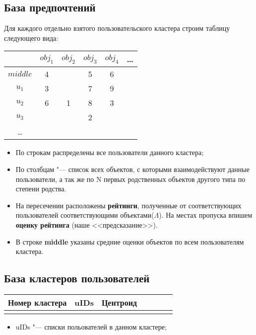 \documentclass[a4paper,14pt]{article}
\begin{document}
\subsection{База предпочтений}
Для каждого отдельно взятого пользовательского кластера строим таблицу следующего вида:
\begin{center}
\begin{tabular}[t]{|c|c|c|c|c|c|}
\hline
    & $obj_1$ & $obj_2$ & $obj_3$ & $obj_4$ & \dots  \\
\hline  
$middle$ & 4 &  & 5 & 6 &   \\  
\hline  
$u_1$ & 3 &  & 7 & 9 &   \\  
\hline 
$u_2$ & 6 & 1  & 8 & 3 &    \\ 
 \hline
$u_3$ &  &  &  2&  &   \\ 
 \hline
\dots &  &  &  &  &   \\ 
 \hline
\end{tabular}
\end{center}
\begin{itemize}
\item По строкам распределены все пользователи данного кластера;
\item По столбцам "--- список всех объектов, с которыми взаимодействуют данные пользователи, а так же по N первых родственных объектов другого типа по степени родства.
\item На пересечении расположены {\bf рейтинги}, полученные от соответствующих пользователей соответствующими объектами($\Lambda$). На местах пропуска впишем {\bf оценку рейтинга} (наше <<предсказание>>).  
\item В строке {\bf middle} указаны средние оценки объектов по всем пользователям кластера.
\end{itemize}

\subsection{База кластеров пользователей}
\begin{center}
\begin{tabular}[t]{|c|c|c|c|c|c|c|}
\hline
  Номер кластера  & uIDs & Центроид  \\
\hline  
& & \\  

\end{tabular}
\end{center}
\begin{itemize}
\item uIDs "--- списки польователей в данном кластере;
\end{itemize}
\end{document}

